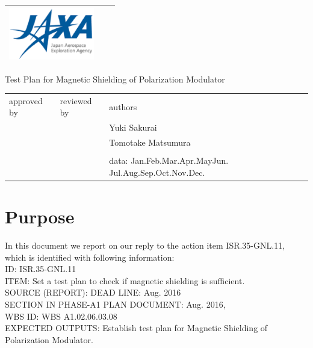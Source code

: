\documentclass[11pt]{article}
\newcommand{\fulltoday}{\ifcase\month\or
    Jan.\or Feb.\or Mar.\or Apr.\or May\or Jun.\or
    Jul.\or Aug.\or Sep.\or Oct.\or Nov.\or Dec.\fi
    \space\number\day\
    \space\number\year}
\begin{document}
\begin{tabular}{ |P|P|P| } \hline
\includegraphics[height=23mm]{figs/images.eps} & &   \rule[0mm]{0mm}{25mm} \\ \hline
\end{tabular}


\vspace*{60mm}
\begin{center}
  \LARGE
  Test Plan for Magnetic Shielding of Polarization Modulator \\
\end{center}
\vspace*{100mm}


\begin{tabular}{ |p{50mm}|p{50mm}|p{50mm}| } \hline
approved by & reviewed by  & authors            \\
            &             & Yuki Sakurai       \\
            &             & Tomotake Matsumura \\
            &             &                    \\
            &             & data: \fulltoday   \\
\hline
\end{tabular}

\clearpage

\section{Purpose}
In this document we report on our reply to the action item ISR.35-GNL.11, which is identified with following information: \\
ID: ISR.35-GNL.11 \\
ITEM: Set a test plan to check if magnetic shielding is sufficient. \\
SOURCE (REPORT): %
DEAD LINE: Aug. 2016 \\
SECTION IN PHASE-A1 PLAN DOCUMENT: Aug. 2016, \\ %
WBS ID: WBS A1.02.06.03.08 \\ %
EXPECTED OUTPUTS: Establish test plan for Magnetic Shielding of Polarization Modulator. \\
\end{document}
